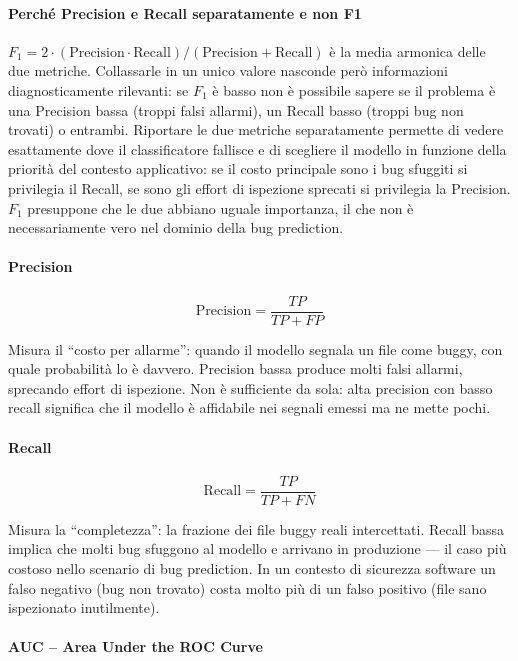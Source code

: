 \paragraph{Perché Precision e Recall separatamente e non F1}

$F_1 = 2 \cdot (\text{Precision} \cdot \text{Recall}) / (\text{Precision} +
\text{Recall})$ è la media armonica delle due metriche. Collassarle in un unico valore
nasconde però informazioni diagnosticamente rilevanti: se $F_1$ è basso non è possibile
sapere se il problema è una Precision bassa (troppi falsi allarmi), un Recall basso
(troppi bug non trovati) o entrambi. Riportare le due metriche separatamente permette di
vedere esattamente dove il classificatore fallisce e di scegliere il modello in funzione
della priorità del contesto applicativo: se il costo principale sono i bug sfuggiti si
privilegia il Recall, se sono gli effort di ispezione sprecati si privilegia la Precision.
$F_1$ presuppone che le due abbiano uguale importanza, il che non è necessariamente vero
nel dominio della bug prediction.

\paragraph{Precision}

\[
\text{Precision} = \frac{TP}{TP + FP}
\]

Misura il ``costo per allarme'': quando il modello segnala un file come buggy, con quale
probabilità lo è davvero. Precision bassa produce molti falsi allarmi, sprecando effort
di ispezione. Non è sufficiente da sola: alta precision con basso recall significa che il
modello è affidabile nei segnali emessi ma ne mette pochi.

\paragraph{Recall}

\[
\text{Recall} = \frac{TP}{TP + FN}
\]

Misura la ``completezza'': la frazione dei file buggy reali intercettati. Recall bassa
implica che molti bug sfuggono al modello e arrivano in produzione --- il caso più costoso
nello scenario di bug prediction. In un contesto di sicurezza software un falso negativo
(bug non trovato) costa molto più di un falso positivo (file sano ispezionato inutilmente).

\paragraph{AUC -- Area Under the ROC Curve}

